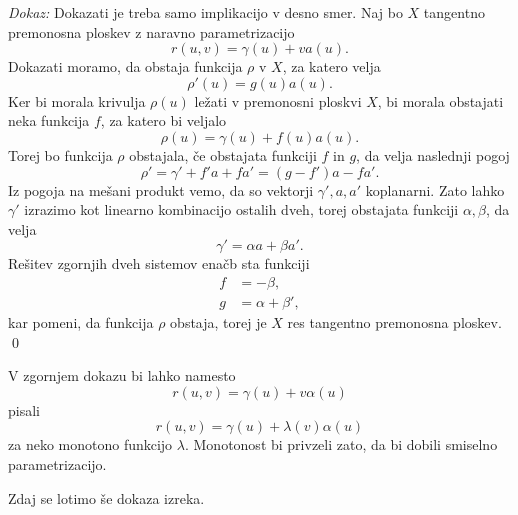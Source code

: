 \noindent
{\em Dokaz:\/}
Dokazati je treba samo implikacijo v desno smer. Naj bo $X$ tangentno premonosna ploskev z naravno parametrizacijo \begin{equation*}
r(u,v) = \gamma(u) + v a(u).
\end{equation*}  
Dokazati moramo, da obstaja funkcija $\rho$ v $X$, za katero velja \begin{equation*}
\rho'(u) = g(u) a(u).
\end{equation*}  
Ker bi morala krivulja $\rho(u)$ ležati v premonosni ploskvi $X$, bi morala obstajati neka funkcija $f$, za katero bi veljalo
\begin{equation*}
\rho(u) = \gamma(u) + f(u)a(u).
\end{equation*}  
Torej bo funkcija $\rho$ obstajala, če obstajata funkciji $f$ in $g$, da velja naslednji pogoj \begin{equation*}
\rho' = \gamma' + f'a + f a' = (g - f') a - fa'.
\end{equation*}  
Iz pogoja na mešani produkt vemo, da so vektorji $\gamma', a, a'$ koplanarni. Zato lahko $\gamma'$ izrazimo kot linearno kombinacijo ostalih dveh, torej
obstajata funkciji $\alpha, \beta$, da velja
\begin{equation*}
\gamma' = \alpha a + \beta a'.
\end{equation*}  
Rešitev zgornjih dveh sistemov enačb sta funkciji \begin{align*}
    f &= -\beta, \\
    g &= \alpha + \beta', 
\end{align*}
kar pomeni, da funkcija $\rho$ obstaja, torej je $X$ res tangentno premonosna ploskev.
\qed

\begin{opomba}
V zgornjem dokazu bi lahko namesto \begin{equation*} r(u,v) = \gamma(u) + v \alpha(u) \end{equation*} pisali 
\begin{equation*} r(u,v) = \gamma(u) + \lambda(v) \alpha(u) \end{equation*} za neko monotono funkcijo $\lambda$.
Monotonost bi privzeli zato, da bi dobili smiselno parametrizacijo.
\end{opomba}

Zdaj se lotimo še dokaza izreka.

